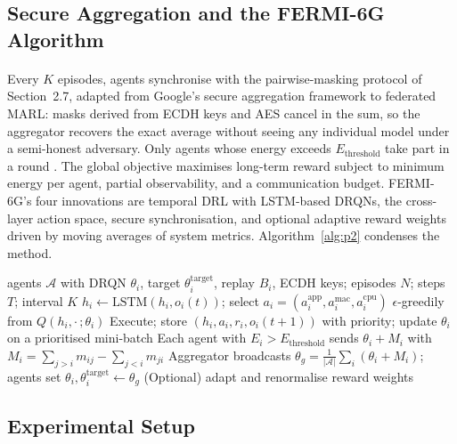 \documentclass[12pt,a4paper,final]{extreport}
\begin{document}
\subsection{Secure Aggregation and the FERMI-6G Algorithm}

\paragraph{} Every $K$ episodes, agents synchronise with the pairwise-masking protocol of Section~2.7, adapted from Google's secure aggregation framework \cite{bonawitz2017} to federated MARL: masks derived from ECDH keys and AES cancel in the sum, so the aggregator recovers the exact average without seeing any individual model under a semi-honest adversary. Only agents whose energy exceeds $E_{\mathrm{threshold}}$ take part in a round \cite{p2}. The global objective maximises long-term reward subject to minimum energy per agent, partial observability, and a communication budget. FERMI-6G's four innovations are temporal DRL with LSTM-based DRQNs, the cross-layer action space, secure synchronisation, and optional adaptive reward weights driven by moving averages of system metrics. Algorithm~\ref{alg:p2} condenses the method.

\begin{algorithm}[htbp]
\caption{FERMI-6G local learning and secure aggregation (condensed from \cite{p2})}\label{alg:p2}
\begin{algorithmic}[1]
\Require agents $\mathcal{A}$ with DRQN $\theta_i$, target $\theta^{\mathrm{target}}_i$, replay $B_i$, ECDH keys; episodes $N$; steps $T$; interval $K$
    \State $h_i\gets\mathrm{LSTM}(h_i,o_i(t))$; select $a_i=(a^{\mathrm{app}}_i,a^{\mathrm{mac}}_i,a^{\mathrm{cpu}}_i)$ $\epsilon$-greedily from $Q(h_i,\cdot\,;\theta_i)$
    \State Execute; store $(h_i,a_i,r_i,o_i(t+1))$ with priority; update $\theta_i$ on a prioritised mini-batch
  \EndFor
    \State Each agent with $E_i>E_{\mathrm{threshold}}$ sends $\theta_i+M_i$ with $M_i=\sum_{j>i}m_{ij}-\sum_{j<i}m_{ji}$
    \State Aggregator broadcasts $\theta_g=\frac{1}{|\mathcal{A}|}\sum_i(\theta_i+M_i)$; agents set $\theta_i,\theta^{\mathrm{target}}_i\gets\theta_g$
    \State (Optional) adapt and renormalise reward weights
  \EndIf
\EndFor
\end{algorithmic}
\end{algorithm}

\subsection{Experimental Setup}
\end{document}

